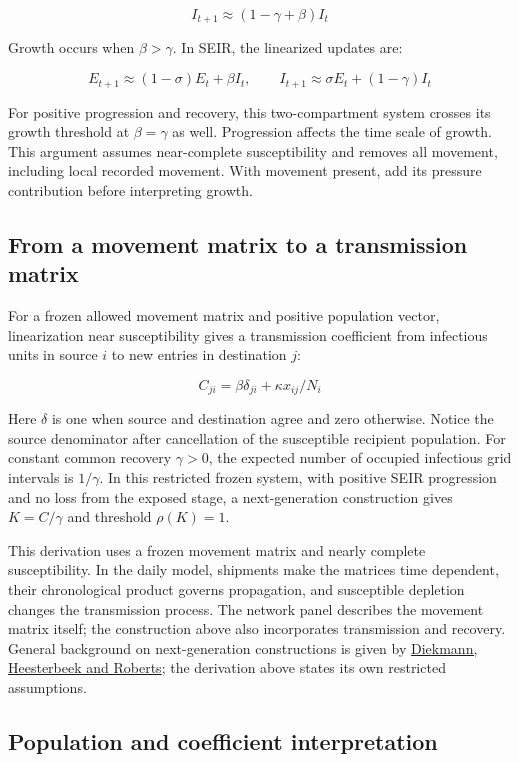\documentclass[11pt,a4paper]{article}
\begin{document}
\[
I_{t+1}\approx(1-\gamma+\beta)I_t
\]

Growth occurs when \(\beta  > \gamma \). In SEIR, the linearized updates
are:

\[
E_{t+1}\approx(1-\sigma)E_t+\beta I_t,\qquad I_{t+1}\approx\sigma E_t+(1-\gamma)I_t
\]

For positive progression and recovery, this two-compartment system
crosses its growth threshold at \(\beta  = \gamma \) as well.
Progression affects the time scale of growth. This argument assumes
near-complete susceptibility and removes all movement, including local
recorded movement. With movement present, add its pressure contribution
before interpreting growth.

\subsection{From a movement matrix to a transmission
matrix}\label{from-a-movement-matrix-to-a-transmission-matrix}

For a frozen allowed movement matrix and positive population vector,
linearization near susceptibility gives a transmission coefficient from
infectious units in source \(i\) to new entries in destination \(j\):

\[
C_{ji}=\beta\delta_{ji}+\kappa x_{ij}/N_i
\]

Here \(\delta \) is one when source and destination agree and zero
otherwise. Notice the source denominator after cancellation of the
susceptible recipient population. For constant common recovery
\(\gamma  > 0\), the expected number of occupied infectious grid
intervals is \(1/\gamma \). In this restricted frozen system, with
positive SEIR progression and no loss from the exposed stage, a
next-generation construction gives \(K = C/\gamma \) and threshold
\(\rho (K) = 1\).

This derivation uses a frozen movement matrix and nearly complete
susceptibility. In the daily model, shipments make the matrices time
dependent, their chronological product governs propagation, and
susceptible depletion changes the transmission process. The network
panel describes the movement matrix itself; the construction above also
incorporates transmission and recovery. General background on
next-generation constructions is given by
\href{https://pubmed.ncbi.nlm.nih.gov/19892718/}{Diekmann, Heesterbeek
and Roberts}; the derivation above states its own restricted
assumptions.

\subsection{Population and coefficient
interpretation}\label{population-and-coefficient-interpretation}
\end{document}

